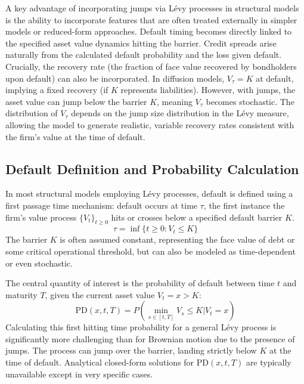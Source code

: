 \documentclass[11pt,twoside,openright]{report}
\begin{document}
A key advantage of incorporating jumps via Lévy processes in structural models is the ability to incorporate features that are often treated externally in simpler models or reduced-form approaches. Default timing becomes directly linked to the specified asset value dynamics hitting the barrier. Credit spreads arise naturally from the calculated default probability and the loss given default. Crucially, the recovery rate (the fraction of face value recovered by bondholders upon default) can also be incorporated. In diffusion models, $V_{\tau} = K$ at default, implying a fixed recovery (if $K$ represents liabilities). However, with jumps, the asset value can jump below the barrier $K$, meaning $V_{\tau}$ becomes stochastic. The distribution of $V_{\tau}$ depends on the jump size distribution in the Lévy measure, allowing the model to generate realistic, variable recovery rates consistent with the firm's value at the time of default.

\subsection{Default Definition and Probability Calculation}
\label{subsec:default_prob_calc}

In most structural models employing Lévy processes, default is defined using a first passage time mechanism: default occurs at time $\tau$, the first instance the firm's value process $\{V_t\}_{t \ge 0}$ hits or crosses below a specified default barrier $K$.
\begin{equation}
\tau = \inf\{t \ge 0 : V_t \le K\}
\label{eq:default_time}
\end{equation}
The barrier $K$ is often assumed constant, representing the face value of debt or some critical operational threshold, but can also be modeled as time-dependent or even stochastic.

The central quantity of interest is the probability of default between time $t$ and maturity $T$, given the current asset value $V_t = x > K$:
\begin{equation}
\text{PD}(x, t, T) = P(\min_{s \in [t,T]} V_s \le K | V_t = x)
\label{eq:probability_default}
\end{equation}
Calculating this first hitting time probability for a general Lévy process is significantly more challenging than for Brownian motion due to the presence of jumps. The process can jump over the barrier, landing strictly below $K$ at the time of default. Analytical closed-form solutions for $\text{PD}(x, t, T)$ are typically unavailable except in very specific cases.
\end{document}
